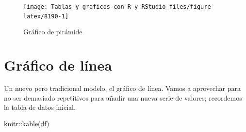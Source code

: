 \documentclass[
]{book}
\newenvironment{Shaded}{\begin{snugshade}}{\end{snugshade}}
\newcommand{\AttributeTok}[1]{\textcolor[rgb]{0.77,0.63,0.00}{#1}}
\newcommand{\ConstantTok}[1]{\textcolor[rgb]{0.00,0.00,0.00}{#1}}
\newcommand{\FunctionTok}[1]{\textcolor[rgb]{0.00,0.00,0.00}{#1}}
\newcommand{\NormalTok}[1]{#1}
\newcommand{\SpecialCharTok}[1]{\textcolor[rgb]{0.00,0.00,0.00}{#1}}
\newcommand{\StringTok}[1]{\textcolor[rgb]{0.31,0.60,0.02}{#1}}
\begin{document}
\begin{Shaded}
\end{Shaded}

\begin{figure}[H]

{\centering \texttt{[image: Tablas-y-graficos-con-R-y-RStudio\_files/figure-latex/8190-1]} 

}

\caption{Gráfico de pirámide}\label{fig:8190}
\end{figure}

\hypertarget{gruxe1fico-de-luxednea}{%
\section{Gráfico de línea}\label{gruxe1fico-de-luxednea}}

Un nuevo pero tradicional modelo, el gráfico de línea. Vamos a aprovechar para no ser demasiado repetitivos para añadir una nueva serie de valores; recordemos la tabla de datos inicial.

\begin{Shaded}
\begin{Highlighting}[]
\NormalTok{knitr}\SpecialCharTok{::}\FunctionTok{kable}\NormalTok{(df)}
\end{Highlighting}
\end{Shaded}
\end{document}
